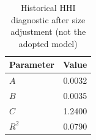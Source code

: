 \begin{table}[htbp]
\centering
\caption{Historical HHI diagnostic after size adjustment (not the adopted model)}
\label{tab:hhi_disp_adj}
\begin{tabular}{lr}
\toprule
\textbf{Parameter} & \textbf{Value} \\
\midrule
$A$ & 0.0032 \\
$B$ & 0.0035 \\
$C$ & 1.2400 \\
$R^2$ & 0.0790 \\
\bottomrule
\end{tabular}
\end{table}
